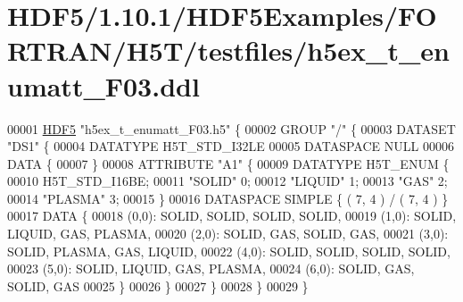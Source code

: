 \hypertarget{_h_d_f5_21_810_81_2_h_d_f5_examples_2_f_o_r_t_r_a_n_2_h5_t_2testfiles_2h5ex__t__enumatt___f03_8ddl_source}{}\section{H\+D\+F5/1.10.1/\+H\+D\+F5\+Examples/\+F\+O\+R\+T\+R\+A\+N/\+H5\+T/testfiles/h5ex\+\_\+t\+\_\+enumatt\+\_\+\+F03.ddl}
\label{_h_d_f5_21_810_81_2_h_d_f5_examples_2_f_o_r_t_r_a_n_2_h5_t_2testfiles_2h5ex__t__enumatt___f03_8ddl_source}

\begin{DoxyCode}
00001 \hyperlink{namespace_h_d_f5}{HDF5} \textcolor{stringliteral}{"h5ex\_t\_enumatt\_F03.h5"} \{
00002 GROUP \textcolor{stringliteral}{"/"} \{
00003    DATASET \textcolor{stringliteral}{"DS1"} \{
00004       DATATYPE  H5T\_STD\_I32LE
00005       DATASPACE  NULL
00006       DATA \{
00007       \}
00008       ATTRIBUTE \textcolor{stringliteral}{"A1"} \{
00009          DATATYPE  H5T\_ENUM \{
00010             H5T\_STD\_I16BE;
00011             \textcolor{stringliteral}{"SOLID"}            0;
00012             \textcolor{stringliteral}{"LIQUID"}           1;
00013             \textcolor{stringliteral}{"GAS"}              2;
00014             \textcolor{stringliteral}{"PLASMA"}           3;
00015          \}
00016          DATASPACE  SIMPLE \{ ( 7, 4 ) / ( 7, 4 ) \}
00017          DATA \{
00018          (0,0): SOLID, SOLID, SOLID, SOLID,
00019          (1,0): SOLID, LIQUID, GAS, PLASMA,
00020          (2,0): SOLID, GAS, SOLID, GAS,
00021          (3,0): SOLID, PLASMA, GAS, LIQUID,
00022          (4,0): SOLID, SOLID, SOLID, SOLID,
00023          (5,0): SOLID, LIQUID, GAS, PLASMA,
00024          (6,0): SOLID, GAS, SOLID, GAS
00025          \}
00026       \}
00027    \}
00028 \}
00029 \}
\end{DoxyCode}
